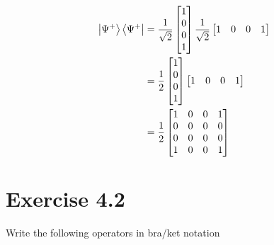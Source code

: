 \documentclass[11pt]{article}
\def\haf{\frac{1}{2}}
\def\srtt{\ensuremath\frac{1}{\sqrt{2}}}
\def\bsp{\ket{\Psi^{+}}}
\begin{document}
\begin{enumerate}
    \begin{align*}
        \bsp\bra{\Psi^+} &= \srtt\begin{bmatrix}1\\0\\0\\1\end{bmatrix}
            \srtt\begin{bmatrix}1&0&0&1\end{bmatrix} \\
            &= \haf \begin{bmatrix}1\\0\\0\\1\end{bmatrix}
            \begin{bmatrix}1&0&0&1\end{bmatrix} \\
            &= \haf \begin{bmatrix}
                1 & 0 & 0 & 1 \\
                0 & 0 & 0 & 0 \\
                0 & 0 & 0 & 0 \\
                1 & 0 & 0 & 1 \\
            \end{bmatrix}
    \end{align*}

\end{enumerate}


\newpage
\section*{Exercise 4.2} Write the following operators in bra/ket notation
\end{document}
